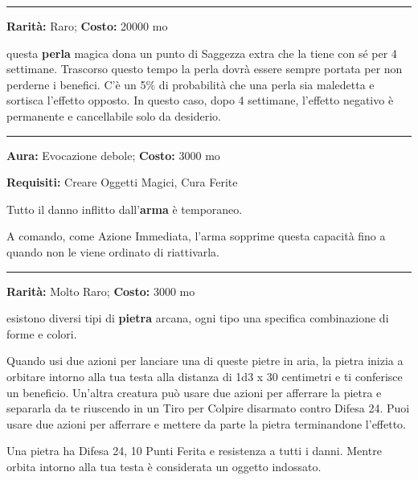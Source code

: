 \begin{multicols}{2}
\smallskip\noindent\rule{\linewidth}{2pt}  \hypertarget{PerladellaSaggezza}{}\smallskip{}\noindent\label{PerladellaSaggezza}

\textbf{Rarità:} Raro; \textbf{Costo:} 20000 mo

questa \textbf{perla} magica dona un punto di Saggezza extra che la tiene con sé per 4 settimane. Trascorso questo tempo la perla dovrà essere sempre portata per non perderne i benefici. C'è un 5\% di probabilità che una perla sia maledetta e sortisca l'effetto opposto. In questo caso, dopo 4 settimane, l'effetto negativo è permanente e cancellabile solo da desiderio.

\smallskip\noindent\rule{\linewidth}{2pt}  \hypertarget{Pietosa}{}\smallskip{}\noindent\label{Pietosa}

\textbf{Aura:} Evocazione debole; \textbf{Costo:} 3000 mo

\textbf{Requisiti:} Creare Oggetti Magici, Cura Ferite

Tutto il danno inflitto dall'\textbf{arma} è temporaneo.

A comando, come Azione Immediata, l'arma sopprime questa capacità fino a quando non le viene ordinato di riattivarla.

\smallskip\noindent\rule{\linewidth}{2pt}  \hypertarget{PietraArcana}{}\smallskip{}\noindent\label{PietraArcana}

\textbf{Rarità:} Molto Raro; \textbf{Costo:} 3000 mo

esistono diversi tipi di \textbf{pietra} arcana, ogni tipo una specifica combinazione di forme e colori.

Quando usi due azioni per lanciare una di queste pietre in aria, la pietra inizia a orbitare intorno alla tua testa alla distanza di 1d3 x 30 centimetri e ti conferisce un beneficio.
Un'altra creatura può usare due azioni per afferrare la pietra e separarla da te riuscendo in un Tiro per Colpire disarmato contro Difesa 24. Puoi usare due azioni per afferrare e mettere da parte la pietra terminandone l'effetto.

Una pietra ha Difesa 24, 10 Punti Ferita e resistenza a tutti i danni. Mentre orbita intorno alla tua testa è considerata un oggetto indossato.


\end{multicols}
